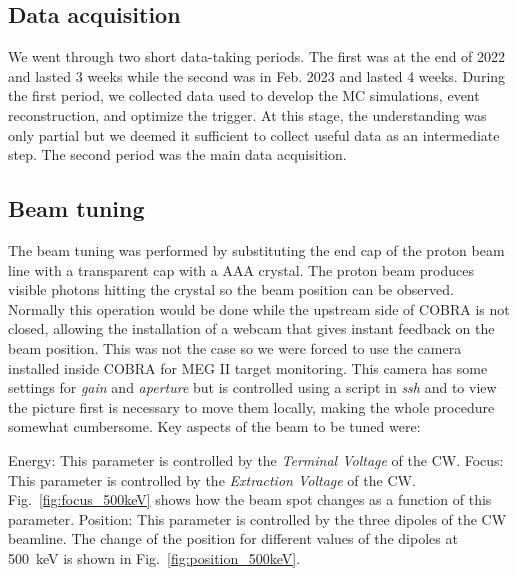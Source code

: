 \begin{refsection}
\section{Data acquisition}
    We went through two short data-taking periods. 
    The first was at the end of 2022 and lasted 3 weeks while the second was in Feb. 2023 and lasted 4 weeks.
    During the first period, we collected data used to develop the MC simulations, event reconstruction, and optimize the trigger.
    At this stage, the understanding was only partial but we deemed it sufficient to collect useful data as an intermediate step.
    The second period was the main data acquisition. 
    
    \subsection{Beam tuning}
        The beam tuning was performed by substituting the end cap of the proton beam line with a transparent cap with a AAA crystal. 
        The proton beam produces visible photons hitting the crystal so the beam position can be observed.
        Normally this operation would be done while the upstream side of COBRA is not closed, allowing the installation of a webcam that gives instant feedback on the beam position.
        This was not the case so we were forced to use the camera installed inside COBRA for MEG II target monitoring.
        This camera has some settings for \textit{gain} and \textit{aperture} but is controlled using a script in \textit{ssh} and to view the picture first is necessary to move them locally, making the whole procedure somewhat cumbersome.
        Key aspects of the beam to be tuned were: 
        \begin{outline}
            \1 Energy: This parameter is controlled by the \textit{Terminal Voltage} of the CW.
            \1 Focus: This parameter is controlled by the \textit{Extraction Voltage} of the CW. Fig.~\ref{fig:focus_500keV} shows how the beam spot changes as a function of this parameter. 
            \1 Position: This parameter is controlled by the three dipoles of the CW beamline. The change of the position for different values of the dipoles at \SI{500}{keV} is shown in Fig.~\ref{fig:position_500keV}.
        \end{outline}


\end{refsection}
